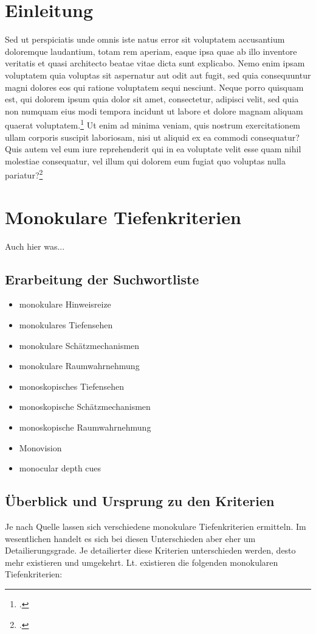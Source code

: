 \section{Einleitung}
Sed ut perspiciatis unde omnis iste natus error sit voluptatem accusantium doloremque laudantium, totam rem aperiam, eaque ipsa quae ab illo inventore veritatis et quasi architecto beatae vitae dicta sunt explicabo. Nemo enim ipsam voluptatem quia voluptas sit aspernatur aut odit aut fugit, sed quia consequuntur magni dolores eos qui ratione voluptatem sequi nesciunt. Neque porro quisquam est, qui dolorem ipsum quia dolor sit amet, consectetur, adipisci velit, sed quia non numquam eius modi tempora incidunt ut labore et dolore magnam aliquam quaerat voluptatem.\footcite[Vgl.][]{testOnline} Ut enim ad minima veniam, quis nostrum exercitationem ullam corporis suscipit laboriosam, nisi ut aliquid ex ea commodi consequatur? Quis autem vel eum iure reprehenderit qui in ea voluptate velit esse quam nihil molestiae consequatur, vel illum qui dolorem eum fugiat quo voluptas nulla pariatur?\footcite[Vgl.][S. 83]{testBuch}

\section{Monokulare Tiefenkriterien}
Auch hier was...

\subsection{Erarbeitung der Suchwortliste}
\begin{itemize}
\item monokulare Hinweisreize 
\item monokulares Tiefensehen
\item monokulare Schätzmechanismen
\item monokulare Raumwahrnehmung
\item monoskopisches Tiefensehen
\item monoskopische Schätzmechanismen
\item monoskopische Raumwahrnehmung
\item Monovision
\item monocular depth cues
\end{itemize}


\subsection{Überblick und Ursprung zu den Kriterien}
Je nach Quelle lassen sich verschiedene monokulare Tiefenkriterien ermitteln. Im wesentlichen handelt es sich bei diesen Unterschieden aber eher um Detailierungsgrade. Je detailierter diese Kriterien unterschieden werden, desto mehr existieren und umgekehrt. Lt. \cite{heidXX} existieren die folgenden monokularen Tiefenkriterien:

